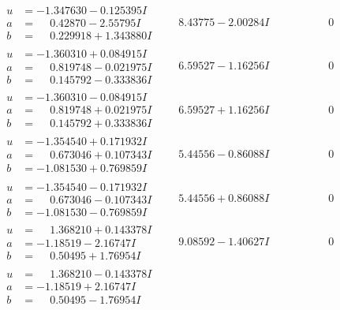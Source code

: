 \documentclass[1p]{elsarticle_modified}
\theoremstyle{definition}
\begin{document}
$$\begin{array}{c|c|c}
\begin{aligned}
u &= -1.347630 - 0.125395 I \\
a &= \phantom{-}0.42870 - 2.55795 I \\
b &= \phantom{-}0.229918 + 1.343880 I\end{aligned}
 & \phantom{-}8.43775 - 2.00284 I & \phantom{-0.000000 } 0 \\ \hline\begin{aligned}
u &= -1.360310 + 0.084915 I \\
a &= \phantom{-}0.819748 - 0.021975 I \\
b &= \phantom{-}0.145792 - 0.333836 I\end{aligned}
 & \phantom{-}6.59527 - 1.16256 I & \phantom{-0.000000 } 0 \\ \hline\begin{aligned}
u &= -1.360310 - 0.084915 I \\
a &= \phantom{-}0.819748 + 0.021975 I \\
b &= \phantom{-}0.145792 + 0.333836 I\end{aligned}
 & \phantom{-}6.59527 + 1.16256 I & \phantom{-0.000000 } 0 \\ \hline\begin{aligned}
u &= -1.354540 + 0.171932 I \\
a &= \phantom{-}0.673046 + 0.107343 I \\
b &= -1.081530 + 0.769859 I\end{aligned}
 & \phantom{-}5.44556 - 0.86088 I & \phantom{-0.000000 } 0 \\ \hline\begin{aligned}
u &= -1.354540 - 0.171932 I \\
a &= \phantom{-}0.673046 - 0.107343 I \\
b &= -1.081530 - 0.769859 I\end{aligned}
 & \phantom{-}5.44556 + 0.86088 I & \phantom{-0.000000 } 0 \\ \hline\begin{aligned}
u &= \phantom{-}1.368210 + 0.143378 I \\
a &= -1.18519 - 2.16747 I \\
b &= \phantom{-}0.50495 + 1.76954 I\end{aligned}
 & \phantom{-}9.08592 - 1.40627 I & \phantom{-0.000000 } 0 \\ \hline\begin{aligned}
u &= \phantom{-}1.368210 - 0.143378 I \\
a &= -1.18519 + 2.16747 I \\
b &= \phantom{-}0.50495 - 1.76954 I\end{aligned}

\end{array}$$
\end{document}
